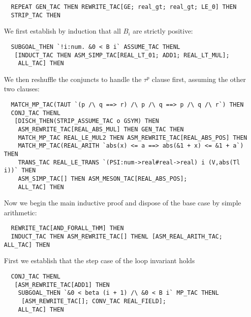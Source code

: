 \documentclass[10pt]{article}
\theoremstyle{definition}
\theoremstyle{remark}
\numberwithin{equation}{section}
\begin{document}
\begin{scriptsize}\begin{verbatim}
  REPEAT GEN_TAC THEN REWRITE_TAC[GE; real_gt; real_gt; LE_0] THEN
  STRIP_TAC THEN
\end{verbatim}\end{scriptsize}

We first establish by induction that all $B_i$ are strictly positive:

\begin{scriptsize}\begin{verbatim}
  SUBGOAL_THEN `!i:num. &0 < B i` ASSUME_TAC THENL
   [INDUCT_TAC THEN ASM_SIMP_TAC[REAL_LT_01; ADD1; REAL_LT_MUL];
    ALL_TAC] THEN
\end{verbatim}\end{scriptsize}

We then reshuffle the conjuncts to handle the $\tau^p$ clause first, assuming
the other two clauses:

\begin{scriptsize}\begin{verbatim}
  MATCH_MP_TAC(TAUT `(p /\ q ==> r) /\ p /\ q ==> p /\ q /\ r`) THEN
  CONJ_TAC THENL
   [DISCH_THEN(STRIP_ASSUME_TAC o GSYM) THEN
    ASM_REWRITE_TAC[REAL_ABS_MUL] THEN GEN_TAC THEN
    MATCH_MP_TAC REAL_LE_MUL2 THEN ASM_REWRITE_TAC[REAL_ABS_POS] THEN
    MATCH_MP_TAC(REAL_ARITH `abs(x) <= a ==> abs(&1 + x) <= &1 + a`) THEN
    TRANS_TAC REAL_LE_TRANS `(PSI:num->real#real->real) i (V,abs(Tl i))` THEN
    ASM_SIMP_TAC[] THEN ASM_MESON_TAC[REAL_ABS_POS];
    ALL_TAC] THEN
\end{verbatim}\end{scriptsize}

Now we begin the main inductive proof and dispose of the base case by simple
arithmetic:

\begin{scriptsize}\begin{verbatim}
  REWRITE_TAC[AND_FORALL_THM] THEN
  INDUCT_TAC THEN ASM_REWRITE_TAC[] THENL [ASM_REAL_ARITH_TAC; ALL_TAC] THEN
\end{verbatim}\end{scriptsize}

First we establish that the step case of the loop invariant holds

\begin{scriptsize}\begin{verbatim}
  CONJ_TAC THENL
   [ASM_REWRITE_TAC[ADD1] THEN
    SUBGOAL_THEN `&0 < beta (i + 1) /\ &0 < B i` MP_TAC THENL
     [ASM_REWRITE_TAC[]; CONV_TAC REAL_FIELD];
    ALL_TAC] THEN
\end{verbatim}\end{scriptsize}
\end{document}
